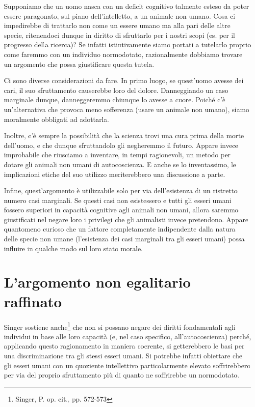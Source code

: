\documentclass[a4paper,11pt,oneside,article]{memoir}
\begin{document}
Supponiamo che un uomo nasca con un deficit cognitivo talmente esteso da poter
essere paragonato, sul piano dell'intelletto, a un animale non umano. Cosa ci
impedirebbe di trattarlo non come un essere umano ma alla pari delle altre
specie, ritenendoci dunque in diritto di sfruttarlo per i nostri scopi (es. per
il progresso della ricerca)? Se infatti istintivamente siamo portati a tutelarlo
proprio come faremmo con un individuo normodotato, razionalmente dobbiamo
trovare un argomento che possa giustificare questa tutela.

Ci sono diverse considerazioni da fare. In primo luogo, se quest'uomo avesse dei
cari, il suo sfruttamento causerebbe loro del dolore. Danneggiando un caso
marginale dunque, danneggeremmo chiunque lo avesse a cuore. Poiché c'è
un'alternativa che provoca meno sofferenza (usare un animale non umano), siamo
moralmente obbligati ad adottarla.

Inoltre, c'è sempre la possibilità che la scienza trovi una cura prima della
morte dell'uomo, e che dunque sfruttandolo gli negheremmo il futuro. Appare
invece improbabile che riusciamo a inventare, in tempi ragionevoli, un metodo
per dotare gli animali non umani di autocoscienza. E anche se lo inventassimo,
le implicazioni etiche del suo utilizzo meriterebbero una discussione a parte.

Infine, quest'argomento è utilizzabile solo per via dell'esistenza di un
ristretto numero casi marginali. Se questi casi non esistessero e tutti gli
esseri umani fossero superiori in capacità cognitive agli animali non umani,
allora saremmo giustificati nel negare loro i privilegi che gli animalisti
invece pretendono. Appare quantomeno curioso che un fattore completamente
indipendente dalla natura delle specie non umane (l'esistenza dei casi marginali
tra gli esseri umani) possa influire in qualche modo sul loro stato morale.

\section{L'argomento non egalitario raffinato}

Singer sostiene anche\footnote{Singer, P. op. cit., pp. 572-573} che non si
possano negare dei diritti fondamentali agli individui in base alle loro
capacità (e, nel caso specifico, all'autocoscienza) perché, applicando questo
ragionamento in maniera coerente, si getterebbero le basi per una
discriminazione tra gli stessi esseri umani. Si potrebbe infatti obiettare che
gli esseri umani con un quoziente intellettivo particolarmente elevato
soffrirebbero per via del proprio sfruttamento più di quanto ne soffrirebbe un
normodotato.
\end{document}

